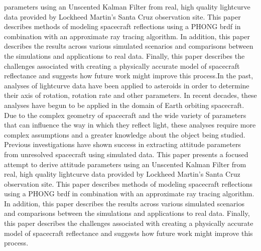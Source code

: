 parameters using an Unscented Kalman Filter from real, high quality lightcurve data provided by Lockheed Martin's Santa Cruz observation site. This paper describes methods of modeling spacecraft reflections using a PHONG brdf in combination with an approximate ray tracing algorithm. In addition, this paper describes the results across various simulated scenarios and comparisons between the simulations and applications to real data. Finally, this paper describes the challenges associated with creating a physically accurate model of spacecraft reflectance and suggests how future work might improve this process.In the past, analyses of lightcurve data have been applied to asteroids in order to determine their axis of rotation, rotation rate and other parameters. In recent decades, these analyses have begun to be applied in the domain of Earth orbiting spacecraft. Due to the complex geometry of spacecraft and the wide variety of parameters that can influence the way in which they reflect light, these analyses require more complex assumptions and a greater knowledge about the object being studied. Previous investigations have shown success in extracting attitude parameters from unresolved spacecraft using simulated data. This paper presents a focused attempt to derive attitude parameters using an Unscented Kalman Filter from real, high quality lightcurve data provided by Lockheed Martin's Santa Cruz observation site. This paper describes methods of modeling spacecraft reflections using a PHONG brdf in combination with an approximate ray tracing algorithm. In addition, this paper describes the results across various simulated scenarios and comparisons between the simulations and applications to real data. Finally, this paper describes the challenges associated with creating a physically accurate model of spacecraft reflectance and suggests how future work might improve this process.
